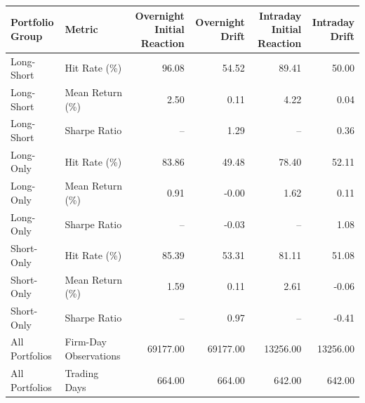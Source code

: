 \begin{tabular}{llrrrr}
\toprule
Portfolio Group &                Metric & Overnight Initial Reaction &  Overnight Drift & Intraday Initial Reaction &  Intraday Drift \\
\midrule
     Long-Short &          Hit Rate (\%) &                      96.08 &            54.52 &                     89.41 &           50.00 \\
     Long-Short &       Mean Return (\%) &                       2.50 &             0.11 &                      4.22 &            0.04 \\
     Long-Short &          Sharpe Ratio &                         -- &             1.29 &                        -- &            0.36 \\
      Long-Only &          Hit Rate (\%) &                      83.86 &            49.48 &                     78.40 &           52.11 \\
      Long-Only &       Mean Return (\%) &                       0.91 &            -0.00 &                      1.62 &            0.11 \\
      Long-Only &          Sharpe Ratio &                         -- &            -0.03 &                        -- &            1.08 \\
     Short-Only &          Hit Rate (\%) &                      85.39 &            53.31 &                     81.11 &           51.08 \\
     Short-Only &       Mean Return (\%) &                       1.59 &             0.11 &                      2.61 &           -0.06 \\
     Short-Only &          Sharpe Ratio &                         -- &             0.97 &                        -- &           -0.41 \\
 All Portfolios & Firm-Day Observations &                   69177.00 &         69177.00 &                  13256.00 &        13256.00 \\
 All Portfolios &          Trading Days &                     664.00 &           664.00 &                    642.00 &          642.00 \\
\bottomrule
\end{tabular}
